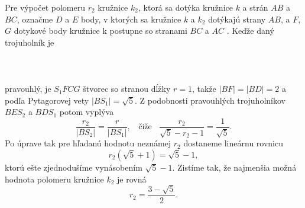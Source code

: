 {Pre výpočet polomeru $r_2$ kružnice $k_2$, ktorá sa dotýka kružnice $k$ a strán $AB$ a $BC$, označme $D$ a $E$ body, v ktorých sa kružnice $k$ a $k_2$ dotýkajú strany $AB$, a $F$, $G$ dotykové body kružnice k postupne so stranami $BC$ a $AC$ . Keďže daný trojuholník je \\
\\
\\
\\
pravouhlý, je $S_1FCG$ štvorec so stranou dĺžky $r = 1$, takže $|BF| = |BD| = 2$ a podľa Pytagorovej vety $|BS_1| =\sqrt{5}$. Z podobnosti pravouhlých trojuholníkov $BES_2$ a $BDS_1$ potom vyplýva
$$\frac{r_2}{|BS_2|}=\frac{r}{|BS_1|}, \ \ \ \ \text{čiže} \ \ \ \ \frac{r_2}{\sqrt{5}- r_2 - 1}=\frac{1}{\sqrt{5}}.$$
Po úprave tak pre hľadanú hodnotu neznámej $r_2$ dostaneme lineárnu rovnicu
$$r_2(\sqrt{5} + 1) =\sqrt{5}-1,$$
ktorú ešte zjednodušíme vynásobením $\sqrt{5}-1$. Zistíme tak, že najmenšia možná hodnota polomeru kružnice $k_2$ je rovná $$r_2 = \frac{3-\sqrt{5}}{2}.$$
}
